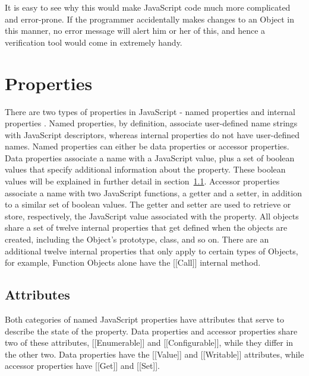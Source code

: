 \documentclass[a4paper,11pt,twoside]{report}
\begin{document}
It is easy to see why this would make JavaScript code much more complicated and error-prone. If the programmer accidentally makes changes to an Object in this manner, no error message will alert him or her of this, and hence a verification tool would come in extremely handy.

\section{Properties}
There are two types of properties in JavaScript - named properties and internal properties \cite{EcmaScript}. Named properties, by definition, associate user-defined name strings with JavaScript descriptors, whereas internal properties do not have user-defined names. Named properties can either be data properties or accessor properties. Data properties associate a name with a JavaScript value, plus a set of boolean values that specify additional information about the property. These boolean values will be explained in further detail in section~\ref{sec:attributes}. Accessor properties associate a name with two JavaScript functions, a getter and a setter, in addition to a similar set of boolean values. The getter and setter are used to retrieve or store, respectively, the JavaScript value associated with the property. All objects share a set of twelve internal properties that get defined when the objects are created, including the Object's prototype, class, and so on. There are an additional twelve internal properties that only apply to certain types of Objects, for example, Function Objects alone have the [[Call]] internal method.

\subsection{Attributes}\label{sec:attributes}
Both categories of named JavaScript properties have attributes that serve to describe the state of the property. Data properties and accessor properties share two of these attributes, [[Enumerable]] and [[Configurable]], while they differ in the other two. Data properties have the [[Value]] and [[Writable]] attributes, while accessor properties have [[Get]] and [[Set]].
\end{document}
